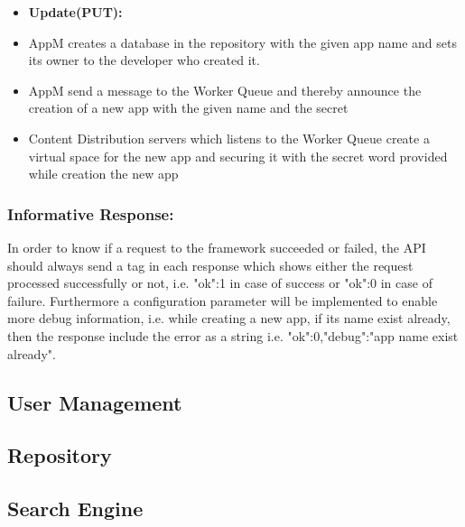 \begin{itemize}
\begin{code}
\begin{verbatim}
GET https://user1:pass@107.23.121.185:8080/cccd/app/vod1
\end{verbatim}
Response:
\begin{verbatim}
{
"data":["collection1","collection2","conf","users"],
"ok":"1"
}
\end{verbatim}
\caption{Listing all collections within an app}
\label{lst:listing_coll}
\end{code}

\item \textbf{Update(PUT):}  
\item AppM creates a database in the repository with the given app name and sets its owner to the developer who created it.
\item AppM send a message to the Worker Queue and thereby announce the creation of a new app with the given name and the secret
\item Content Distribution servers which listens to the Worker Queue create a virtual space for the new app and securing it with the secret word provided while creation the new app
\end{itemize}



\subsubsection{Informative Response:} In order to know if a request to the framework succeeded or failed, the API should always send a tag in each response which shows either the request processed successfully or not, i.e. {"ok":1} in case of success or {"ok":0} in case of failure. Furthermore a configuration parameter will be implemented to enable more debug information, i.e. while creating a new app, if its name exist already, then the response include the error as a string i.e. {"ok":0,"debug":"app name exist already"}.


\subsection{User Management}
\subsection{Repository\label{sec:des_repo}}
\subsection{Search Engine\label{sec:des_se_en}}
